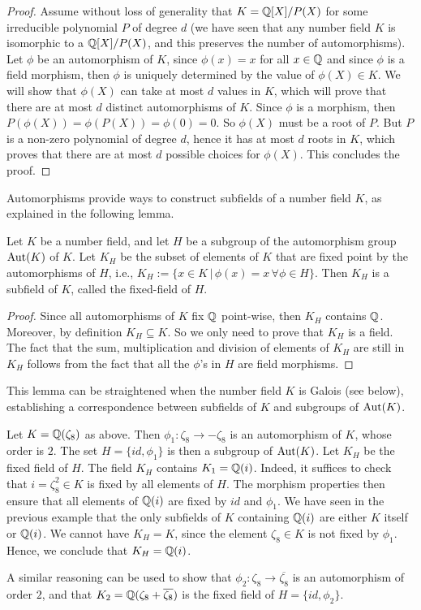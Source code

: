 \begin{proof}
Assume without loss of generality that $K = \mathbb{Q}[X]/P(X)$ for some irreducible polynomial $P$ of degree $d$ (we have seen that any number field $K$ is isomorphic to a $\mathbb{Q}[X]/P(X)$, and this preserves the number of automorphisms). Let $\phi$ be an automorphism of $K$, since $\phi(x) = x$ for all $x \in \mathbb{Q}$ and since $\phi$ is a field morphism, then $\phi$ is uniquely determined by the value of $\phi(X) \in K$. We will show that $\phi(X)$ can take at most $d$ values in $K$, which will prove that there are at most $d$ distinct automorphisms of $K$.
Since $\phi$ is a morphism, then $P(\phi(X)) = \phi(P(X)) = \phi(0) = 0$. So $\phi(X)$ must be a root of $P$. But $P$ is a non-zero polynomial of degree $d$, hence it has at most $d$ roots in $K$, which proves that there are at most $d$ possible choices for $\phi(X)$. This concludes the proof.
\end{proof}

Automorphisms provide ways to construct subfields of a number field $K$, as explained in the following lemma.
\begin{lemma}
Let $K$ be a number field, and let $H$ be a subgroup of the automorphism group $\operatorname{Aut}(K)$ of $K$. Let $K_H$ be the subset of elements of $K$ that are fixed point by the automorphisms of $H$, i.e., $K_H := \{ x \in K \,|\, \phi(x) = x \, \forall \phi \in H\}$. Then $K_H$ is a subfield of $K$, called the fixed-field of $H$.
\end{lemma}

\begin{proof}
Since all automorphisms of $K$ fix $\mathbb{Q}$ point-wise, then $K_H$ contains $\mathbb{Q}$. Moreover, by definition $K_H \subseteq K$. So we only need to prove that $K_H$ is a field. The fact that the sum, multiplication and division of elements of $K_H$ are still in $K_H$ follows from the fact that all the $\phi$'s in $H$ are field morphisms.
\end{proof}

This lemma can be straightened when the number field $K$ is Galois (see below), establishing a correspondence between subfields of $K$ and subgroups of $\operatorname{Aut}(K)$.

\begin{example}
Let $K = \mathbb{Q}(\zeta_8)$ as above. Then $\phi_1: \zeta_8 \rightarrow -\zeta_8$ is an automorphism of $K$, whose order is $2$. The set $H = \{id, \phi_1\}$ is then a subgroup of $\operatorname{Aut}(K)$. Let $K_H$ be the fixed field of $H$. The field $K_H$ contains $K_1 = \mathbb{Q}(i)$. Indeed, it suffices to check that $i = \zeta_8^2 \in K$ is fixed by all elements of $H$. The morphism properties then ensure that all elements of $\mathbb{Q}(i)$ are fixed by $id$ and $\phi_1$. We have seen in the previous example that the only subfields of $K$ containing $\mathbb{Q}(i)$ are either $K$ itself or $\mathbb{Q}(i)$. We cannot have $K_H = K$, since the element $\zeta_8 \in K$ is not fixed by $\phi_1$. Hence, we conclude that $K_H = \mathbb{Q}(i)$.

A similar reasoning can be used to show that $\phi_2: \zeta_8 \rightarrow \overline{\zeta_8}$ is an automorphism of order $2$, and that $K_2 = \mathbb{Q}(\zeta_8 + \overline{\zeta_8})$ is the fixed field of $H = \{id, \phi_2\}$.
\end{example}

